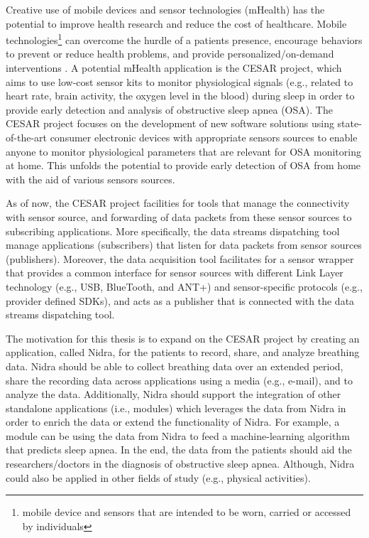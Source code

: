 Creative use of mobile devices and sensor technologies (mHealth) has the potential to improve health research and reduce the cost of healthcare. Mobile technologies\footnote{mobile device and sensors that are intended to be worn, carried or accessed by individuals} can overcome the hurdle of a patients presence, encourage behaviors to prevent or reduce health problems, and provide personalized/on-demand interventions \cite{kumar2013mobile}. A potential mHealth application is the CESAR project, which aims to use low-cost sensor kits to monitor physiological signals (e.g., related to heart rate, brain activity, the oxygen level in the blood) during sleep in order to provide early detection and analysis of obstructive sleep apnea (OSA). The CESAR project \cite{cesar} focuses on the development of new software solutions using state-of-the-art consumer electronic devices with appropriate sensors sources to enable anyone to monitor physiological parameters that are relevant for OSA monitoring at home. This unfolds the potential to provide early detection of OSA from home with the aid of various sensors sources. 

As of now, the CESAR project facilities for tools that manage the connectivity with sensor source, and forwarding of data packets from these sensor sources to subscribing applications. More specifically, the data streams dispatching tool \cite{daniel} manage applications (subscribers) that listen for data packets from sensor sources (publishers). Moreover, the data acquisition tool \cite{gjoby} facilitates for a sensor wrapper that provides a common interface for sensor sources with different Link Layer technology (e.g., USB, BlueTooth, and ANT+) and sensor-specific protocols (e.g., provider defined SDKs), and acts as a publisher that is connected with the data streams dispatching tool. 

The motivation for this thesis is to expand on the CESAR project by creating an application, called Nidra, for the patients to record, share, and analyze breathing data. Nidra should be able to collect breathing data over an extended period, share the recording data across applications using a media (e.g., e-mail), and to analyze the data. Additionally, Nidra should support the integration of other standalone applications (i.e., modules) which leverages the data from Nidra in order to enrich the data or extend the functionality of Nidra. For example, a module can be using the data from Nidra to feed a machine-learning algorithm that predicts sleep apnea. In the end, the data from the patients should aid the researchers/doctors in the diagnosis of obstructive sleep apnea. Although, Nidra could also be applied in other fields of study (e.g., physical activities).